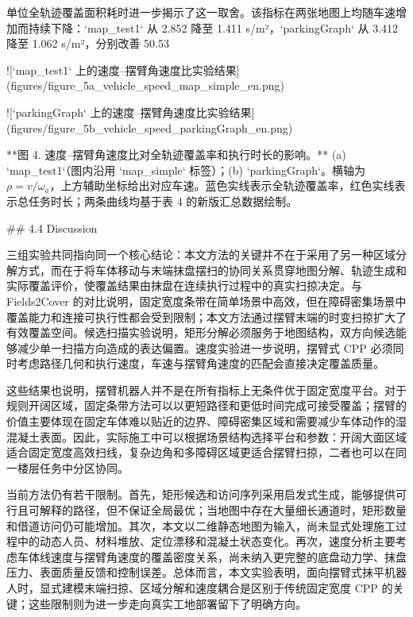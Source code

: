   

单位全轨迹覆盖面积耗时进一步揭示了这一取舍。该指标在两张地图上均随车速增加而持续下降：`map_test1` 从 2.852 降至 1.411 s/m²，`parkingGraph` 从 3.412 降至 1.062 s/m²，分别改善 50.53%

  
![`map_test1` 上的速度--摆臂角速度比实验结果](figures/figure_5a_vehicle_speed_map_simple_en.png)

![`parkingGraph` 上的速度--摆臂角速度比实验结果](figures/figure_5b_vehicle_speed_parkingGraph_en.png)

**图 4. 速度--摆臂角速度比对全轨迹覆盖率和执行时长的影响。** (a) `map_test1`（图内沿用 `map_simple` 标签）；(b) `parkingGraph`。横轴为 $\rho=v/\omega_a$，上方辅助坐标给出对应车速。蓝色实线表示全轨迹覆盖率，红色实线表示总任务时长；两条曲线均基于表 4 的新版汇总数据绘制。

  

## 4.4 Discussion

  

三组实验共同指向同一个核心结论：本文方法的关键并不在于采用了另一种区域分解方式，而在于将车体移动与末端抹盘摆扫的协同关系贯穿地图分解、轨迹生成和实际覆盖评价，使覆盖结果由抹盘在连续执行过程中的真实扫掠决定。与 Fields2Cover 的对比说明，固定宽度条带在简单场景中高效，但在障碍密集场景中覆盖能力和连接可执行性都会受到限制；本文方法通过摆臂末端的时变扫掠扩大了有效覆盖空间。候选扫描实验说明，矩形分解必须服务于地图结构，双方向候选能够减少单一扫描方向造成的表达偏置。速度实验进一步说明，摆臂式 CPP 必须同时考虑路径几何和执行速度，车速与摆臂角速度的匹配会直接决定覆盖质量。

  

这些结果也说明，摆臂机器人并不是在所有指标上无条件优于固定宽度平台。对于规则开阔区域，固定条带方法可以以更短路径和更低时间完成可接受覆盖；摆臂的价值主要体现在固定车体难以贴近的边界、障碍密集区域和需要减少车体动作的湿混凝土表面。因此，实际施工中可以根据场景结构选择平台和参数：开阔大面区域适合固定宽度高效扫线，复杂边角和多障碍区域更适合摆臂扫掠，二者也可以在同一楼层任务中分区协同。

  

当前方法仍有若干限制。首先，矩形候选和访问序列采用启发式生成，能够提供可行且可解释的路径，但不保证全局最优；当地图中存在大量细长通道时，矩形数量和借道访问仍可能增加。其次，本文以二维静态地图为输入，尚未显式处理施工过程中的动态人员、材料堆放、定位漂移和混凝土状态变化。再次，速度分析主要考虑车体线速度与摆臂角速度的覆盖密度关系，尚未纳入更完整的底盘动力学、抹盘压力、表面质量反馈和控制误差。总体而言，本文实验表明，面向摆臂式抹平机器人时，显式建模末端扫掠、区域分解和速度耦合是区别于传统固定宽度 CPP 的关键；这些限制则为进一步走向真实工地部署留下了明确方向。

  


